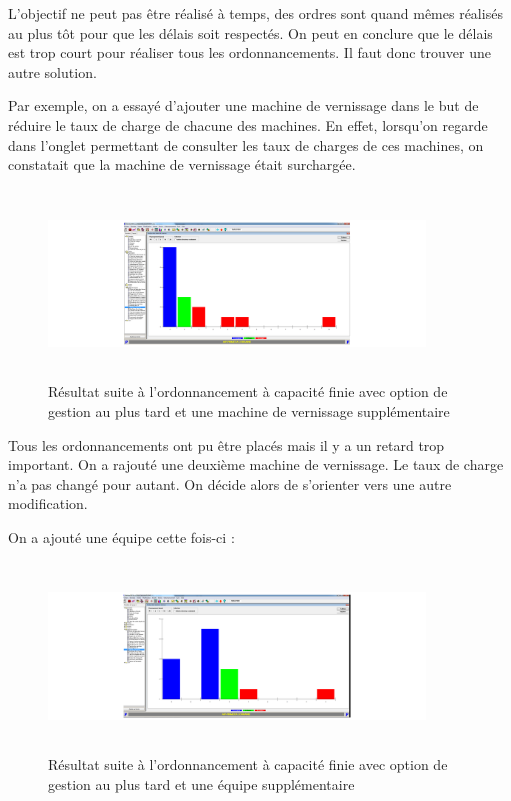 \documentclass{scrreprt}
\begin{document}
L'objectif ne peut pas être réalisé à temps, des ordres sont quand mêmes réalisés au plus tôt pour que les délais soit respectés. On peut en conclure que 
le délais est trop court pour réaliser tous les ordonnancements. Il faut donc trouver une autre solution. 

\newpage
Par exemple, on a essayé d’ajouter une machine de vernissage dans le but de réduire le taux de charge de chacune des machines. En effet, lorsqu’on regarde dans l’onglet permettant de consulter
les taux de charges de ces machines, on constatait que la machine de vernissage était surchargée.

\begin{figure}[!h]
\centering
\includegraphics[width=10cm, height=5cm]{1vernisenplus.png}
\caption{Résultat suite à l'ordonnancement à capacité finie avec option de gestion au plus tard et une machine de vernissage supplémentaire}
\end{figure}


Tous les ordonnancements ont pu être placés mais il y a un retard trop important. On a rajouté une deuxième machine de vernissage. Le taux de charge n’a pas changé pour autant. On décide alors de s'orienter vers une autre modification. 

On a ajouté une équipe cette fois-ci : 

\begin{figure}[!h]
\centering
\includegraphics[width=10cm, height=5cm]{1equipeenplus.png}
\caption{Résultat suite à l'ordonnancement à capacité finie avec option de gestion au plus tard et une équipe supplémentaire}
\end{figure}
\end{document}
